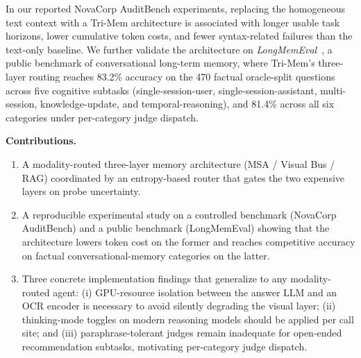 \documentclass[conference]{IEEEtran}
\begin{document}
In our reported NovaCorp AuditBench experiments, replacing the homogeneous text context with a Tri-Mem architecture is associated with longer usable task horizons, lower cumulative token costs, and fewer syntax-related failures than the text-only baseline. We further validate the architecture on \textit{LongMemEval}~\cite{longmemeval2024}, a public benchmark of conversational long-term memory, where Tri-Mem's three-layer routing reaches 83.2\% accuracy on the 470 factual oracle-split questions across five cognitive subtasks (single-session-user, single-session-assistant, multi-session, knowledge-update, and temporal-reasoning), and 81.4\% across all six categories under per-category judge dispatch.

\textbf{Contributions.}
\begin{enumerate}
    \item A modality-routed three-layer memory architecture (MSA / Visual Bus / RAG) coordinated by an entropy-based router that gates the two expensive layers on probe uncertainty.
    \item A reproducible experimental study on a controlled benchmark (NovaCorp AuditBench) and a public benchmark (LongMemEval) showing that the architecture lowers token cost on the former and reaches competitive accuracy on factual conversational-memory categories on the latter.
    \item Three concrete implementation findings that generalize to any modality-routed agent: (i) GPU-resource isolation between the answer LLM and an OCR encoder is necessary to avoid silently degrading the visual layer; (ii) thinking-mode toggles on modern reasoning models should be applied per call site; and (iii) paraphrase-tolerant judges remain inadequate for open-ended recommendation subtasks, motivating per-category judge dispatch.
\end{enumerate}
\end{document}
